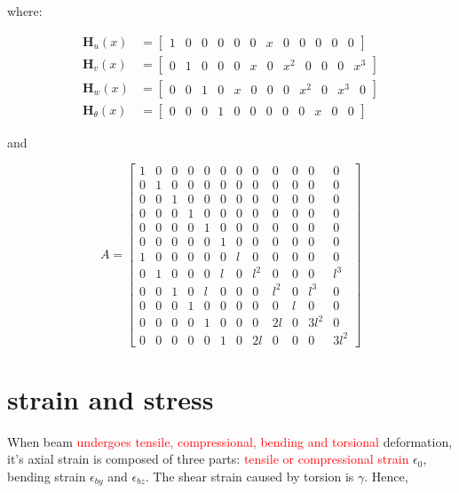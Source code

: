 where:

\setcounter{MaxMatrixCols}{20}
\begin{align}
	\mathbf{H}_u(x) &= \begin{bmatrix} 1 & 0 & 0 & 0 & 0 & 0 & x & 0 & 0 & 0 & 0 & 0 \end{bmatrix} \\
	\mathbf{H}_v(x) &= \begin{bmatrix} 0 & 1 & 0 & 0 & 0 & x & 0 & x^2 & 0 & 0 & 0 & x^3 \end{bmatrix} \\
	\mathbf{H}_w(x) &= \begin{bmatrix} 0 & 0 & 1 & 0 & x & 0 & 0 & 0 & x^2 & 0 & x^3 & 0 \end{bmatrix} \\
	\mathbf{H}_\theta(x) &= \begin{bmatrix} 0 & 0 & 0 & 1 & 0 & 0 & 0 & 0 & 0 & x & 0 & 0 \end{bmatrix} 
\end{align}

and 

\begin{equation}\label{key}
A = \begin{bmatrix}
1 & 0 & 0 & 0 & 0 & 0 & 0 & 0 & 0 & 0 & 0 & 0 \\ 
0 & 1 & 0 & 0 & 0 & 0 & 0 & 0 & 0 & 0 & 0 & 0 \\ 
0 & 0 & 1 & 0 & 0 & 0 & 0 & 0 & 0 & 0 & 0 & 0 \\ 
0 & 0 & 0 & 1 & 0 & 0 & 0 & 0 & 0 & 0 & 0 & 0 \\ 
0 & 0 & 0 & 0 & 1 & 0 & 0 & 0 & 0 & 0 & 0 & 0 \\ 
0 & 0 & 0 & 0 & 0 & 1 & 0 & 0 & 0 & 0 & 0 & 0 \\ 
1 & 0 & 0 & 0 & 0 & 0 & l & 0 & 0 & 0 & 0 & 0 \\ 
0 & 1 & 0 & 0 & 0 & l & 0 & l^2 & 0 & 0 & 0 & l^3 \\ 
0 & 0 & 1 & 0 & l & 0 & 0 & 0 & l^2 & 0 & l^3 & 0 \\ 
0 & 0 & 0 & 1 & 0 & 0 & 0 & 0 & 0 & l & 0 & 0 \\ 
0 & 0 & 0 & 0 & 1 & 0 & 0 & 0 & 2l & 0 & 3 l^2 & 0 \\ 
0 & 0 & 0 & 0 & 0 & 1 & 0 & 2 l & 0 & 0 & 0 & 3 l^2
\end{bmatrix} 
\end{equation}

\section{strain and stress}
When beam \textcolor{red}{undergoes tensile, compressional, bending and torsional}  deformation, it's axial strain is composed of three parts: \textcolor{red}{tensile or compressional strain} $ \epsilon_0 $, bending strain $ \epsilon_{by} $ and $ \epsilon_{bz} $. The shear strain caused by torsion is $ \gamma $. Hence,

